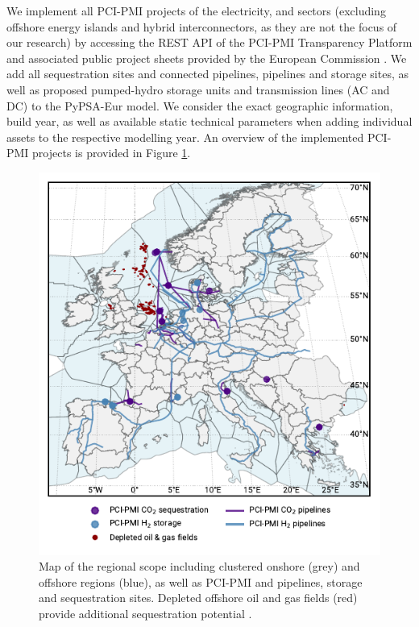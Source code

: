 \documentclass[preprint,12pt,sort&compress]{elsarticle}
\begin{document}
We implement all PCI-PMI projects of the electricity,  and  sectors (excluding offshore energy islands and hybrid interconnectors, as they are not the focus of our research) by accessing the REST API of the PCI-PMI Transparency Platform and associated public project sheets provided by the European Commission \cite{europeancommissionPCIPMITransparencyPlatform2024}. We add all  sequestration sites and connected pipelines,  pipelines and storage sites, as well as proposed pumped-hydro storage units and transmission lines (AC and DC) to the PyPSA-Eur model. We consider the exact geographic information, build year, as well as available static technical parameters when adding individual assets to the respective modelling year. An overview of the implemented PCI-PMI projects is provided in Figure \ref{fig:regional_scope_map}.
\begin{figure}[htbp]
  \centering
  \includegraphics{map_adm_pcipmi}
  \caption{Map of the regional scope including clustered onshore (grey) and offshore regions (blue), as well as PCI-PMI  and  pipelines, storage and sequestration sites. Depleted offshore oil and gas fields (red) provide additional  sequestration potential \cite{hofmannH2CO2Network2025}.}
  \label{fig:regional_scope_map}
\end{figure}
\end{document}
